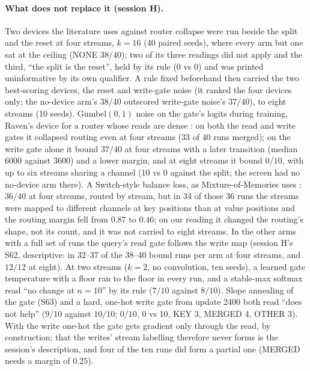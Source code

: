 \documentclass[11pt]{article}
\begin{document}
\paragraph{What does not replace it (session H).} Two devices the literature uses against router collapse were run beside the split and the reset at four streams, $k = 16$ (40 paired seeds), where every arm but one sat at the ceiling (NONE $38/40$); two of its three readings did not apply and the third, ``the split is the reset'', held by its rule (0 vs 0) and was printed uninformative by its own qualifier. A rule fixed beforehand then carried the two best-scoring devices, the reset and write-gate noise (it ranked the four devices only; the no-device arm's $38/40$ outscored write-gate noise's $37/40$), to eight streams (10 seeds). Gumbel$(0,1)$ noise on the gate's logits during training, Raven's device for a router whose reads are dense \cite{raven}: on both the read and write gates it collapsed routing even at four streams (33 of 40 runs merged); on the write gate alone it bound $37/40$ at four streams with a later transition (median 6000 against 3600) and a lower margin, and at eight streams it bound $0/10$, with up to six streams sharing a channel (10 vs 0 against the split; the screen had no no-device arm there). A Switch-style balance loss, as Mixture-of-Memories uses \cite{mom, switch}: $36/40$ at four streams, routed by stream, but in 34 of those 36 runs the streams were mapped to different channels at key positions than at value positions and the routing margin fell from $0.87$ to $0.46$; on our reading it changed the routing's shape, not its count, and it was not carried to eight streams. In the other arms with a full set of runs the query's read gate follows the write map (session H's S62, descriptive: in 32--37 of the 38--40 bound runs per arm at four streams, and $12/12$ at eight). At two streams ($k = 2$, no convolution, ten seeds), a learned gate temperature with a floor ran to the floor in every run, and a stable-max softmax read ``no change at $n = 10$'' by its rule ($7/10$ against $8/10$). Slope annealing of the gate (S63) and a hard, one-hot write gate from update 2400 both read ``does not help'' ($9/10$ against $10/10$; $0/10$, 0 vs 10, KEY 3, MERGED 4, OTHER 3). With the write one-hot the gate gets gradient only through the read, by construction; that the writes' stream labelling therefore never forms is the session's description, and four of the ten runs did form a partial one (MERGED needs a margin of $0.25$).
\end{document}

